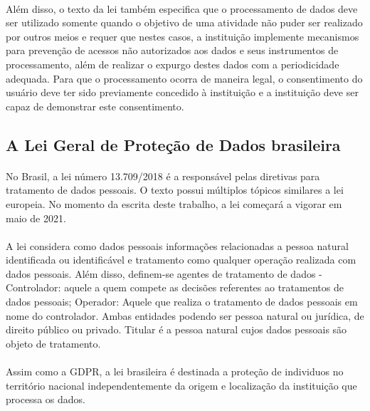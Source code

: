 \paragraph{} Além disso, o texto da lei também especifica que o processamento de dados deve ser utilizado somente quando o objetivo de uma atividade não puder ser realizado por outros meios e requer que nestes casos, a instituição implemente mecanismos para prevenção de acessos não autorizados aos dados e seus instrumentos de processamento, além de realizar o expurgo destes dados com a periodicidade adequada. Para que o processamento ocorra de maneira legal, o consentimento do usuário deve ter sido previamente concedido à instituição e a instituição deve ser capaz de demonstrar este consentimento.


\subsection{A Lei Geral de Proteção de Dados brasileira}

\paragraph{} No Brasil, a lei número 13.709/2018\cite{br-13709-2018} é a responsável pelas diretivas para tratamento de dados pessoais. O texto possui múltiplos tópicos similares a lei europeia. No momento da escrita deste trabalho, a lei começará a vigorar em maio de 2021.

\paragraph{} A lei considera como dados pessoais informações relacionadas a pessoa natural identificada ou identificável e tratamento como qualquer operação realizada com dados pessoais. Além disso, definem-se agentes de tratamento de dados - Controlador: aquele a quem compete as decisões referentes ao tratamentos de dados pessoais; Operador: Aquele que realiza o tratamento de dados pessoais em nome do controlador. Ambas entidades podendo ser pessoa natural ou jurídica, de direito público ou privado. Titular é a pessoa natural cujos dados pessoais são objeto de tratamento.

\paragraph{} Assim como a GDPR, a lei brasileira é destinada a proteção de individuos no território nacional independentemente da origem e localização da instituição que processa os dados.

